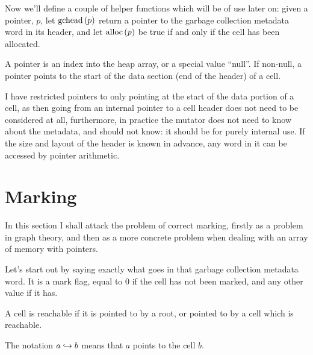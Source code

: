 Now we'll define a couple of helper functions which will be of use
later on: given a \gls{pointer}, $p$, let $\gchead{p}$ return a pointer to the
\gls{garbage collection} metadata word in its header, and let
$\alloc{p}$ be true if and only if the \gls{cell} has been allocated.

\begin{definition}[Pointer]
  A pointer is an index into the heap array, or a special value
  ``null''. If non-null, a pointer points to the start of the data
  section (end of the header) of a cell.
\end{definition}

I have restricted \glspl{pointer} to only pointing at the start of the
data portion of a \gls{cell}, as then going from an internal
\gls{pointer} to a cell header does not need to be considered at all,
furthermore, in practice the \gls{mutator} does not need to know about
the metadata, and should not know: it should be for purely internal
use. If the size and layout of the header is known in advance, any
word in it can be accessed by \gls{pointer} arithmetic.

\section{Marking}

In this section I shall attack the problem of correct marking, firstly
as a problem in graph theory, and then as a more concrete problem when
dealing with an array of memory with pointers.

Let's start out by saying exactly what goes in that \gls{garbage
  collection} metadata word. It is a mark flag, equal to 0 if the
\gls{cell} has not been marked, and any other value if it has.

\begin{definition}[Reachable]
  A cell is reachable if it is pointed to by a root, or pointed to by
  a cell which is reachable.

  \begin{minipage}{.5\textwidth}
    \begin{prooftree}
    \end{prooftree}
  \end{minipage}
  \begin{minipage}{.5\textwidth}
    \begin{prooftree}
    \end{prooftree}
  \end{minipage}

  The notation $a \pointsto b$ means that $a$ points to the cell $b$.
\end{definition}

